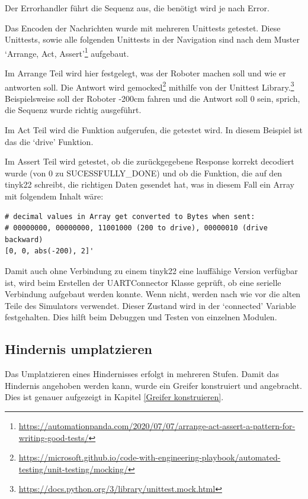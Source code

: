 Der Errorhandler führt die Sequenz aus, die benötigt wird je nach Error.

Das Encoden der Nachrichten wurde mit mehreren Unittests getestet. Diese Unittests, sowie alle folgenden Unittests in der Navigation sind nach dem Muster `Arrange, Act, Assert'\footnote{\url{https://automationpanda.com/2020/07/07/arrange-act-assert-a-pattern-for-writing-good-tests/}} aufgebaut.

Im Arrange Teil wird hier festgelegt, was der Roboter machen soll und wie er antworten soll. Die Antwort wird gemocked\footnote{\url{https://microsoft.github.io/code-with-engineering-playbook/automated-testing/unit-testing/mocking/}} mithilfe von der Unittest Library.\footnote{\url{https://docs.python.org/3/library/unittest.mock.html}} Beispielsweise soll der Roboter -200cm fahren und die Antwort soll 0 sein, sprich, die Sequenz wurde richtig ausgeführt.

Im Act Teil wird die Funktion aufgerufen, die getestet wird. In diesem Beispiel ist das die `drive' Funktion.

Im Assert Teil wird getestet, ob die zurückgegebene Response korrekt decodiert wurde (von 0 zu SUCESSFULLY\_DONE) und ob die Funktion, die auf den \gls{tinyk22} schreibt, die richtigen Daten gesendet hat, was in diesem Fall ein Array mit folgendem Inhalt wäre:

\begin{verbatim}
# decimal values in Array get converted to Bytes when sent:
# 00000000, 00000000, 11001000 (200 to drive), 00000010 (drive backward)
[0, 0, abs(-200), 2]'
\end{verbatim}

Damit auch ohne Verbindung zu einem \gls{tinyk22} eine lauffähige Version verfügbar ist, wird beim Erstellen der UARTConnector Klasse geprüft, ob eine serielle Verbindung aufgebaut werden konnte. Wenn nicht, werden nach wie vor die alten Teile des Simulators verwendet. Dieser Zustand wird in der `connected' Variable festgehalten. Dies hilft beim Debuggen und Testen von einzelnen Modulen.


\newpage
\subsection{Hindernis umplatzieren}

Das Umplatzieren eines Hindernisses erfolgt in mehreren Stufen. Damit das Hindernis angehoben werden kann, wurde ein Greifer konstruiert und angebracht. Dies ist genauer aufgezeigt in Kapitel \ref{Greifer konstruieren}.

